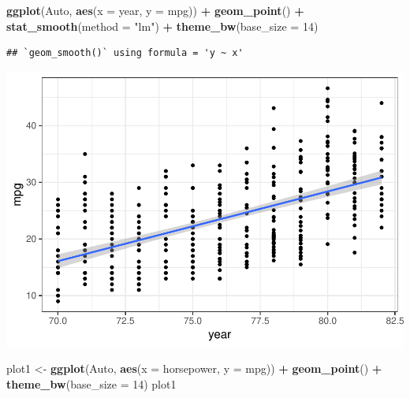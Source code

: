 \documentclass[
]{article}
\newenvironment{Shaded}{\begin{snugshade}}{\end{snugshade}}
\newcommand{\AttributeTok}[1]{\textcolor[rgb]{0.13,0.29,0.53}{#1}}
\newcommand{\DecValTok}[1]{\textcolor[rgb]{0.00,0.00,0.81}{#1}}
\newcommand{\FunctionTok}[1]{\textcolor[rgb]{0.13,0.29,0.53}{\textbf{#1}}}
\newcommand{\NormalTok}[1]{#1}
\newcommand{\OtherTok}[1]{\textcolor[rgb]{0.56,0.35,0.01}{#1}}
\newcommand{\SpecialCharTok}[1]{\textcolor[rgb]{0.81,0.36,0.00}{\textbf{#1}}}
\newcommand{\StringTok}[1]{\textcolor[rgb]{0.31,0.60,0.02}{#1}}
\begin{document}
\begin{Shaded}
\begin{Highlighting}[]
\FunctionTok{ggplot}\NormalTok{(Auto, }\FunctionTok{aes}\NormalTok{(}\AttributeTok{x =}\NormalTok{ year, }\AttributeTok{y =}\NormalTok{ mpg)) }\SpecialCharTok{+} \FunctionTok{geom\_point}\NormalTok{() }\SpecialCharTok{+}
    \FunctionTok{stat\_smooth}\NormalTok{(}\AttributeTok{method =} \StringTok{"lm"}\NormalTok{) }\SpecialCharTok{+}
    \FunctionTok{theme\_bw}\NormalTok{(}\AttributeTok{base\_size =} \DecValTok{14}\NormalTok{)}
\end{Highlighting}
\end{Shaded}

\begin{verbatim}
## `geom_smooth()` using formula = 'y ~ x'
\end{verbatim}

\includegraphics{Modelos_Estatisticos-2024-08-10_files/figure-latex/unnamed-chunk-3-2.pdf}

\begin{Shaded}
\begin{Highlighting}[]
\NormalTok{plot1 }\OtherTok{\textless{}{-}} \FunctionTok{ggplot}\NormalTok{(Auto, }\FunctionTok{aes}\NormalTok{(}\AttributeTok{x =}\NormalTok{ horsepower, }\AttributeTok{y =}\NormalTok{ mpg)) }\SpecialCharTok{+} \FunctionTok{geom\_point}\NormalTok{() }\SpecialCharTok{+} \FunctionTok{theme\_bw}\NormalTok{(}\AttributeTok{base\_size =} \DecValTok{14}\NormalTok{)}
\NormalTok{plot1}
\end{Highlighting}
\end{Shaded}
\end{document}

